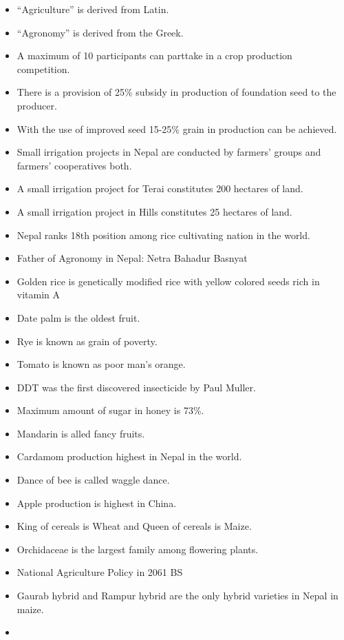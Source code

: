 \documentclass[
  openany]{book}
\providecommand{\tightlist}{%
  \setlength{\itemsep}{0pt}\setlength{\parskip}{0pt}}
\begin{document}
\begin{itemize}
\tightlist
\item
  ``Agriculture'' is derived from Latin.
\item
  ``Agronomy'' is derived from the Greek.
\item
  A maximum of 10 participants can parttake in a crop production competition.
\item
  There is a provision of 25\% subsidy in production of foundation seed to the producer.
\item
  With the use of improved seed 15-25\% grain in production can be achieved.
\item
  Small irrigation projects in Nepal are conducted by farmers' groups and farmers' cooperatives both.
\item
  A small irrigation project for Terai constitutes 200 hectares of land.
\item
  A small irrigation project in Hills constitutes 25 hectares of land.
\item
  Nepal ranks 18th position among rice cultivating nation in the world.
\item
  Father of Agronomy in Nepal: Netra Bahadur Basnyat
\item
  Golden rice is genetically modified rice with yellow colored seeds rich in vitamin A
\item
  Date palm is the oldest fruit.
\item
  Rye is known as grain of poverty.
\item
  Tomato is known as poor man's orange.
\item
  DDT was the first discovered insecticide by Paul Muller.
\item
  Maximum amount of sugar in honey is 73\%.
\item
  Mandarin is alled fancy fruits.
\item
  Cardamom production highest in Nepal in the world.
\item
  Dance of bee is called waggle dance.
\item
  Apple production is highest in China.
\item
  King of cereals is Wheat and Queen of cereals is Maize.
\item
  Orchidaceae is the largest family among flowering plants.
\item
  National Agriculture Policy in 2061 BS
\item
  Gaurab hybrid and Rampur hybrid are the only hybrid varieties in Nepal in maize.
\item

\end{itemize}
\end{document}

